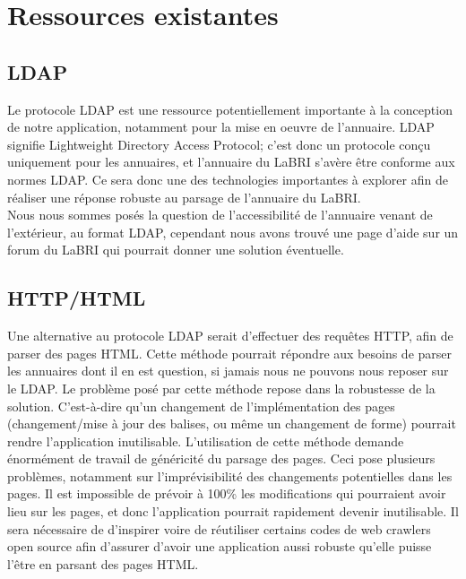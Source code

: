 \documentclass [pdftex,12pt] {report}
\begin{document}
\section{Ressources existantes}

\subsection{LDAP}
Le protocole LDAP est une ressource potentiellement importante à la conception de notre application, notamment pour la mise en oeuvre de l'annuaire. LDAP signifie Lightweight Directory Access Protocol; c'est donc un protocole conçu uniquement pour les annuaires, et l'annuaire du LaBRI s'avère être conforme aux normes LDAP.
Ce sera donc une des technologies importantes à explorer afin de réaliser une réponse robuste au parsage de l'annuaire du LaBRI.\\
Nous nous sommes posés la question de l'accessibilité de l'annuaire venant de l'extérieur, au format LDAP, cependant nous avons trouvé une page d'aide sur un forum du LaBRI\cite{labriForum} qui pourrait donner une solution éventuelle.

\subsection{HTTP/HTML}
Une alternative au protocole LDAP serait d'effectuer des requêtes HTTP, afin de parser des pages HTML. Cette méthode pourrait répondre aux besoins de parser les annuaires dont il en est question, si jamais nous ne pouvons nous reposer sur le LDAP. Le problème posé par cette méthode repose dans la robustesse de la solution. C'est-à-dire qu'un changement de l'implémentation des pages (changement/mise à jour des balises, ou même un changement de forme) pourrait rendre l'application inutilisable. L'utilisation de cette méthode demande énormément de travail de généricité du parsage des pages.
Ceci pose plusieurs problèmes, notamment sur l'imprévisibilité des changements potentielles dans les pages. Il est impossible de prévoir à 100\% les modifications qui pourraient avoir lieu sur les pages, et donc l'application pourrait rapidement devenir inutilisable. Il sera nécessaire de d'inspirer voire de réutiliser certains codes de web crawlers open source afin d'assurer d'avoir une application aussi robuste qu'elle puisse l'être en parsant des pages HTML.
\end{document}
